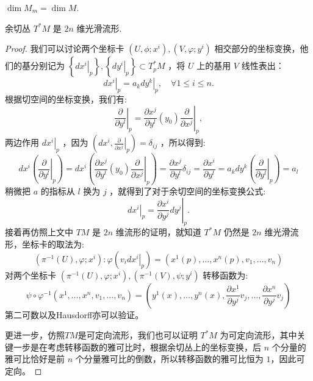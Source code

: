 \begin{cor}
    $\dim M_m=\dim M$.
\end{cor}
\begin{thm}
    余切丛 $T^* M$ 是 $2n$ 维光滑流形.
\end{thm}
\begin{proof}
    我们可以讨论两个坐标卡 $\left(U, \phi ; x^i\right),\left(V, \varphi ; y^i\right)$ 相交部分的坐标变换，他们的基分别记为 $\left\{\left.d x^i\right|_p\right\},\left\{\left.d y^i\right|_p\right\} \subset T_p^* M$ ，将 $U$ 上的基用 $V$ 线性表出：
$$
\left.d x^i\right|_p=\left.a_k d y^k\right|_p, \quad \forall 1 \leq i \leq n .
$$
根据切空间的坐标变换，我们有:
$$
\left.\frac{\partial}{\partial y^l}\right|_p=\left.\frac{\partial x^j}{\partial y^l}\left(y_0\right) \frac{\partial}{\partial x^j}\right|_p,
$$
两边作用 $\left.d x^i\right|_p$ ，因为 $\left(d x^i,\left.\frac{\partial}{\partial x^j}\right|_p\right)=\delta_{i j}$ ，所以得到:
$$
d x^i\left(\left.\frac{\partial}{\partial y^l}\right|_p\right)=d x^i\left(\left.\frac{\partial x^j}{\partial y^l}\left(y_0\right) \frac{\partial}{\partial x^j}\right|_p\right)=\frac{\partial x^j}{\partial y^l} \delta_{i j}=\frac{\partial x^i}{\partial y^l}=a_k d y^k\left(\left.\frac{\partial}{\partial y^l}\right|_p\right)=a_l
$$
稍微把 $a$ 的指标从 $l$ 换为 $j$ ，就得到了对于余切空间的坐标变换公式:
$$
\left.d x^i\right|_p=\left.\frac{\partial x^i}{\partial y^j} d y^j\right|_p .
$$
接着再仿照上文中 $T M$ 是 $2 n$ 维流形的证明，就知道 $T^* M$ 仍然是 $2 n$ 维光滑流形，坐标卡的取法为:
$$
\left(\pi^{-1}(U), \varphi ; x^i\right): \varphi\left(\left.v_i d x^i\right|_p\right)=\left(x^1(p), \ldots, x^n(p), v_1, \ldots, v_n\right)
$$
对两个坐标卡 $\left(\pi^{-1}(U), \varphi ; x^i\right),\left(\pi^{-1}(V), \psi ; y^i\right)$ 转移函数为:
$$
\psi \circ \varphi^{-1}\left(x^1, \ldots, x^n, v_1, \ldots, v_n\right)=\left(y^1(x), \ldots, y^n(x), \frac{\partial x^1}{\partial y^j} v_j, \ldots, \frac{\partial x^n}{\partial y^j} v_j\right)
$$
第二可数以及Hausdorff亦可以验证。

更进一步，仿照$TM$是可定向流形，我们也可以证明 $T^* M$ 为可定向流形，其中关键一步是在考虑转移函数的雅可比时，根据余切丛上的坐标变换，后 $n$ 个分量的雅可比恰好是前 $n$ 个分量雅可比的倒数，所以转移函数的雅可比恒为 $1$，因此可定向。
\end{proof}
